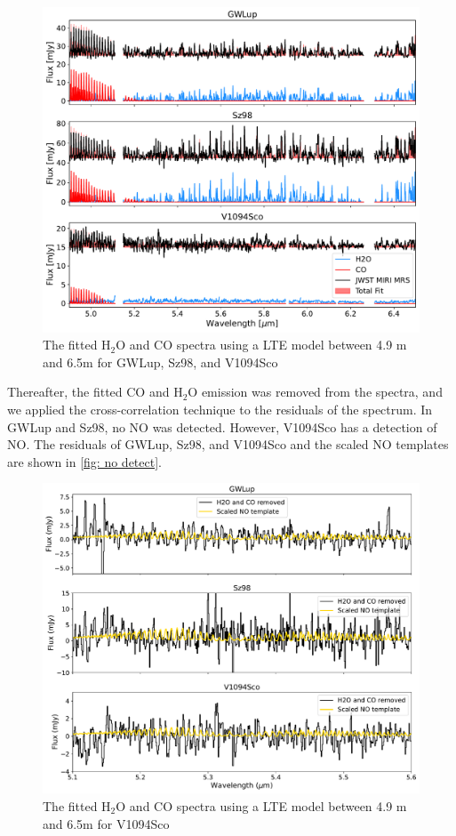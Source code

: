 \documentclass[oneside, single, authoryear, semicolon, 12pt]{lion-msc}
\newcommand{\4}{$_4$}
\newcommand{\3}{$_3$}
\newcommand{\2}{$_2$}
\begin{document}
\begin{figure}[H]
    \centering
    \includegraphics[width=\linewidth]{Figures/Fits.pdf}
    \caption{The fitted H\2O and CO spectra using a LTE model between 4.9 \textmu m and 6.5\textmu m for GWLup, Sz98, and V1094Sco}
    \label{fig: fits}
\end{figure}

Thereafter, the fitted CO and H\2O emission was removed from the spectra, and we applied the cross-correlation technique to the residuals of the spectrum. In GWLup and Sz98, no NO was detected. However, V1094Sco has a detection of NO. The residuals of GWLup, Sz98, and V1094Sco and the scaled NO templates are shown in \autoref{fig: no detect}. 

\begin{figure}[H]
    \centering
    \includegraphics[width=\linewidth]{Figures/NO_Detect_stacked.pdf}
    \caption{The fitted H\2O and CO spectra using a LTE model between 4.9 \textmu m and 6.5\textmu m for V1094Sco}
    \label{fig: no detect}
\end{figure}
\end{document}
